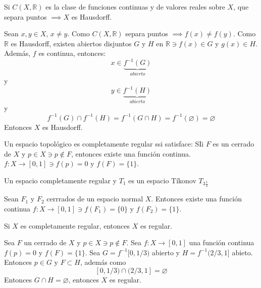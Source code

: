 \begin{prop}
    Si $C(X,\mathbb{R})$ es la clase de funciones continuas y de valores reales sobre $X$, que separa puntos $\implies X$ es Hausdorff. 
    \begin{dem}
        Sean $x,y\in X$, $x\neq y$. Como $C(X,\mathbb{R})$ separa puntos $\implies f(x)\neq f(y)$. Como $\mathbb{R}$ es Hausdorff, existen abiertos disjuntos $G$ y $H$ en $\mathbb{R}\ni f(x)\in G$ y $g(x)\in H$. Además, $f$ es continua, entonces: 
        $$x\in \underbrace{f^{-1}(G)}_{abierto}$$
        y  
        $$y\in \underbrace{f^{-1}(H)}_{abierto}$$
        y 
        $$f^{-1}(G)\cap f^{-1}(H)= f^{-1}(G\cap H)=f^{-1}(\varnothing)=\varnothing$$
        Entonces $X$ es Hausdorff.
    \end{dem}
\end{prop}


\begin{definicion}
    Un espacio topológico es completamente regular ssi satisface: SIi $F$ es un cerrado de $X$ y $p\in X\ni p\not\in F$, entonces existe una función continua. $f:X\to [0,1]\ni f(p)=0$ y $f(F)=\{1\}$.
\end{definicion}


\begin{nota}
    Un espacio completamente regular y $T_1$ es un espacio  Tíkonov $T_{3  \frac{1}{2}}$
\end{nota}


\begin{nota}
    Sean $F_1$ y $F_2$ cerrrados de un espacio normal $X$. Entonces existe una función continua $f:X\to [0,1]\ni f(F_1)=\{0\}$ y $f(F_2)=\{1\}$.
\end{nota}

\begin{teorema}
    Si $X$ es completamente regular, entonces $X$ es regular. 
    \begin{dem}
        Sea $F$ un cerrado de $X$ y $p\in X\ni p\not\in F$. Sea $f:X\to [0,1]$ una función continua $f(p)=0$ y $f(F)=\{1\}$. Sea $G=f^{-1}[0,1/3)$ abierto y $H=f^{-1}(2/3,1]$ abieto. Entonces $p\in G$ y $F\subset H$, además como $$[0,1/3)\cap (2/3,1]=\varnothing$$
        Entonces $G\cap H=\varnothing$, entonces $X$ es regular. 
    \end{dem}
\end{teorema}


